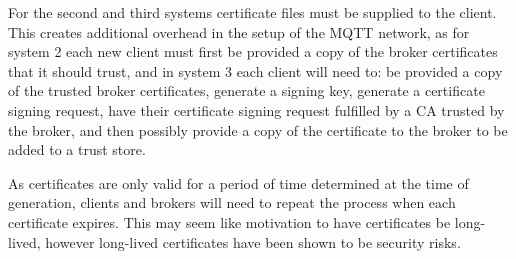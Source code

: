 \documentclass[12pt]{article}
\begin{document}
For the second and third systems certificate files must be supplied to the client. This creates additional overhead in the setup of the MQTT network, as for system 2 each new client must first be provided a copy of the broker certificates that it should trust, and in system 3 each client will need to: be provided a copy of the trusted broker certificates, generate a signing key, generate a certificate signing request, have their certificate signing request fulfilled by a CA trusted by the broker, and then possibly provide a copy of the certificate to the broker to be added to a trust store.\par
As certificates are only valid for a period of time determined at the time of generation, clients and brokers will need to repeat the process when each certificate expires. This may seem like motivation to have certificates be long-lived, however long-lived certificates have been shown to be security risks. 
\end{document}
